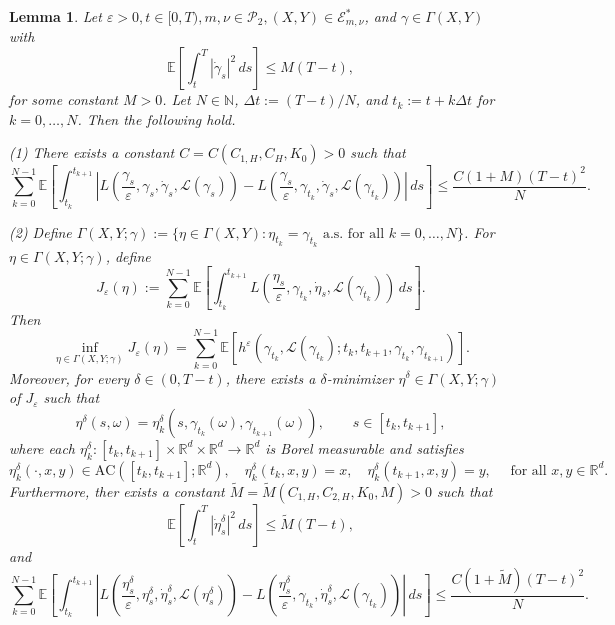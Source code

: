 \documentclass[reqno,11pt]{amsart}
\newtheorem{lemma}[theorem]{Lemma}
\numberwithin{equation}{section}
\newcommand{\e}{\varepsilon}
\newcommand{\ep}{\varepsilon}
\newcommand{\nd}{\noindent}
\begin{document}
\begin{lemma} \label{lem:fixest}
    Let $\e >0, t \in[0, T) ,m, \nu \in \mathcal{P}_2, (X,Y) \in \mathcal{E}^\ast_{m,\nu}$, and $\gamma \in \Gamma(X,Y)$ with
    \[
    \mathbb{E}\left[\int_{t}^T|\dot{\gamma}_s|^2 \,ds\right] \leq M(T-t),
    \]
    for some constant $M>0$. Let $N \in \mathbb{N}$, $\Delta t := (T-t)/N$, and $t_k := t + k\Delta t$ for $k=0,\dots,N$. Then the following hold.

    \nd
    (1) There exists a constant $C=C(C_{1,H}, C_H, K_0)>0$ such that
    \[
\sum_{k=0}^{N-1}\mathbb{E}\left[\int_{t_k}^{t_{k+1}} \left|L\left( \frac{\gamma_s}{\e}, \gamma_s, \dot{\gamma}_s, \mathcal{L}(\gamma_s) \right)-
L\left(\frac{\gamma_s}{\ep}, \gamma_{t_k}, \dot{\gamma}_s, \mathcal{L}(\gamma_{t_k})\right)\right|\,ds\right] \leq \frac{C(1+M)(T-t)^2}{N}.
    \]

\nd
(2) Define $\Gamma(X,Y;\gamma)
:=
\{\eta\in \Gamma(X,Y) : \eta_{t_k}=\gamma_{t_k}\,\, \text{a.s. for all } k=0,\dots,N\}$.  For $\eta \in \Gamma(X,Y;\gamma)$, define
\[
J_\e(\eta)
:=
\sum_{k=0}^{N-1}
\mathbb E\left[
\int_{t_k}^{t_{k+1}}
L\left(\frac{\eta_s}{\varepsilon},\gamma_{t_k},\dot{\eta}_s,\mathcal{L}(\gamma_{t_k})\right)\,ds\right].
\]
Then
\[
\inf_{\eta\in\Gamma(X,Y;\gamma)} J_\varepsilon(\eta)
=
\sum_{k=0}^{N-1}
\mathbb E \left[
h^\e\left(\gamma_{t_k},\mathcal{L}(\gamma_{t_k});t_k,t_{k+1},
\gamma_{t_k},\gamma_{t_{k+1}}\right)\right].
\]
Moreover, for every $\delta\in(0,T-t)$, there exists a $\delta$-minimizer
$\eta^\delta\in\Gamma(X,Y;\gamma)$ of $J_\varepsilon$ such that
\[
\eta^\delta(s, \omega)
=
\eta^\delta_k\left(s,\gamma_{t_k}(\omega),\gamma_{t_{k+1}}(\omega)\right),
\qquad s\in[t_k,t_{k+1}],
\]
where each $\eta^\delta_k:[t_k,t_{k+1}]\times\mathbb R^d\times\mathbb R^d\to\mathbb R^d$ is Borel measurable and satisfies
\[
\eta^\delta_k(\cdot,x,y)\in \mathrm{AC}([t_k,t_{k+1}];\mathbb R^d),
\quad
\eta^\delta_k(t_k,x,y)=x,\quad
\eta^\delta_k(t_{k+1},x,y)=y,\quad \text{ for all }x, y\in \mathbb{R}^d.
\]
Furthermore, ther exists a constant $\tilde{M}=\tilde{M}(C_{1,H},C_{2,H},K_0,M)>0$ such that
\[
\mathbb E\left[
\int_t^T
\left|\dot{\eta}^\delta_s\right|^2 \,ds\right]
\le \tilde{M} (T-t),
\]
and
\begin{equation}\label{eq:freeze-est-eta}
\sum_{k=0}^{N-1}\mathbb{E}\left[\int_{t_k}^{t_{k+1}} \left|L\left( \frac{\eta^\delta_s}{\e}, \eta^\delta_s, \dot{\eta}^\delta_s, \mathcal{L}(\eta^\delta_s) \right)-
L\left(\frac{\eta^\delta_s}{\ep}, \gamma_{t_k}, \dot{\eta}^\delta_s, \mathcal{L}(\gamma_{t_k})\right)\right|\,ds\right] \leq \frac{C(1+\tilde{M})(T-t)^2}{N}.
\end{equation}
\end{lemma}
\end{document}
